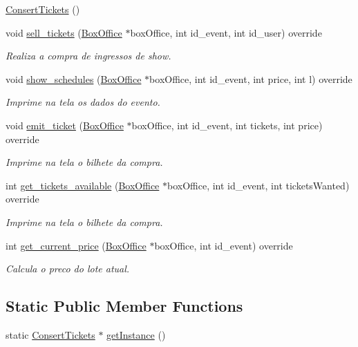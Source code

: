 \begin{DoxyCompactItemize}
\item 
\hyperlink{class_consert_tickets_ab5d6797982b8c17b329d54b6f0dfb615}{Consert\+Tickets} ()
\item 
void \hyperlink{class_consert_tickets_a12a927f5284af7463c8947eda023ce92}{sell\+\_\+tickets} (\hyperlink{class_box_office}{Box\+Office} $\ast$box\+Office, int id\+\_\+event, int id\+\_\+user) override
\begin{DoxyCompactList}\small\item\em Realiza a compra de ingressos de show. \end{DoxyCompactList}\item 
void \hyperlink{class_consert_tickets_a4cc1eefa1e883b7ebad0fa679b81159c}{show\+\_\+schedules} (\hyperlink{class_box_office}{Box\+Office} $\ast$box\+Office, int id\+\_\+event, int price, int l) override
\begin{DoxyCompactList}\small\item\em Imprime na tela os dados do evento. \end{DoxyCompactList}\item 
void \hyperlink{class_consert_tickets_af1c027f9ef23dc346c6c51f9d2b5ac68}{emit\+\_\+ticket} (\hyperlink{class_box_office}{Box\+Office} $\ast$box\+Office, int id\+\_\+event, int tickets, int price) override
\begin{DoxyCompactList}\small\item\em Imprime na tela o bilhete da compra. \end{DoxyCompactList}\item 
int \hyperlink{class_consert_tickets_a1c4ea135087a4990cbe7b10a97949864}{get\+\_\+tickets\+\_\+available} (\hyperlink{class_box_office}{Box\+Office} $\ast$box\+Office, int id\+\_\+event, int tickets\+Wanted) override
\begin{DoxyCompactList}\small\item\em Imprime na tela o bilhete da compra. \end{DoxyCompactList}\item 
int \hyperlink{class_consert_tickets_a313b214e5fb67be2561563756ab79ad9}{get\+\_\+current\+\_\+price} (\hyperlink{class_box_office}{Box\+Office} $\ast$box\+Office, int id\+\_\+event) override
\begin{DoxyCompactList}\small\item\em Calcula o preco do lote atual. \end{DoxyCompactList}\end{DoxyCompactItemize}
\subsection*{Static Public Member Functions}
\begin{DoxyCompactItemize}
\item 
static \hyperlink{class_consert_tickets}{Consert\+Tickets} $\ast$ \hyperlink{class_consert_tickets_a5a4cdef5d2d75042421c5d979074fcb0}{get\+Instance} ()
\end{DoxyCompactItemize}


